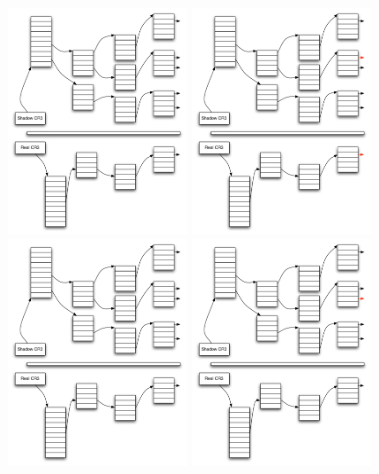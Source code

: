 \begin{frame}
\begin{overlayarea}{10cm}{10cm}
 {\includegraphics[height=6cm]{pic/shadow_page_table_5}}
 {\includegraphics[height=6cm]{pic/shadow_page_table_6}}
 {\includegraphics[height=6cm]{pic/shadow_page_table_7}}
 {\includegraphics[height=6cm]{pic/shadow_page_table_8}}

\end{overlayarea}
\end{frame}
